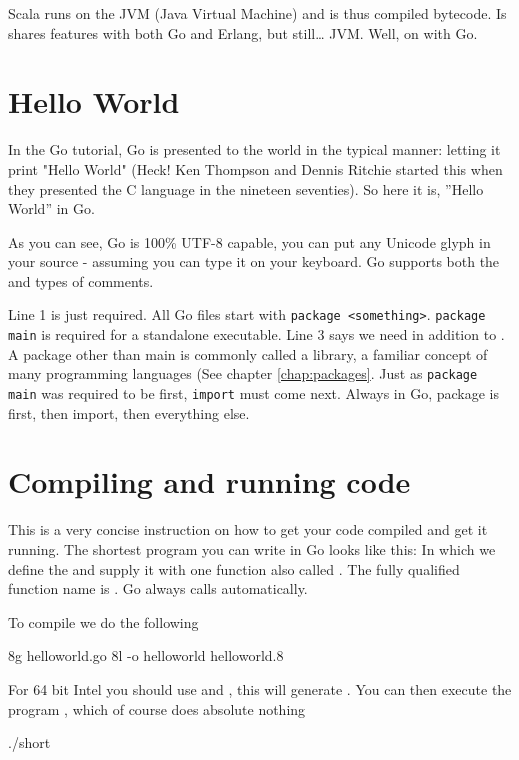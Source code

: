 Scala runs on the JVM (Java Virtual Machine) and is thus compiled 
bytecode. Is shares features with both Go and Erlang, but still\ldots
JVM.  Well, on with Go.

\section{Hello World}
\label{sec:hello world}
In the Go tutorial, Go is presented to the world in the typical
manner: letting it print "Hello World" (Heck! Ken Thompson and
Dennis Ritchie started this when they presented the C language in 
the nineteen seventies).
So here it is, ''Hello World'' in Go.


As you can see, Go is 100\% UTF-8 capable, you can put any Unicode
glyph in your source - assuming you can type it on your keyboard.
Go supports both the \texttt{\rem{/* */}} and \texttt{\rem{//}} types of comments. 

Line 1 is just required.  All Go files start with \lstinline{package <something>}.
\lstinline{package main} is required for a standalone executable.  Line 3 says
we need  in addition to .  A package other than
main is commonly called a library, a familiar concept of many programming
languages (See chapter \ref{chap:packages}. 
Just as \lstinline{package main} was required to be first, 
\lstinline{import} must come next. Always in Go, package is first, then import, 
then everything else.

\section{Compiling and running code}
This is a very concise instruction on how to get your code
compiled and get it running.
The shortest program you can write in Go looks like
this:
In which we define the   and supply it with one
function also called . The fully qualified function
name is . Go always calls  automatically.

To compile we do the following

\begin{display}
\pr 8g helloworld.go \qquad\qquad\qquad{}
\pr 8l -o helloworld helloworld.8 \qquad{}
\end{display}
For 64 bit Intel you should use  and , this will
generate .
You can then execute the program , which of course
does absolute nothing
\begin{display}
\pr ./short
\end{display}

